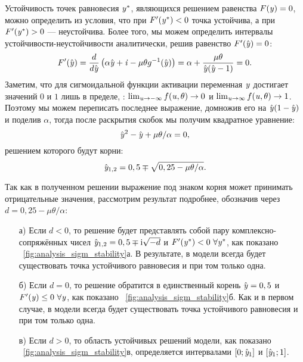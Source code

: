 Устойчивость точек равновесия $\mathit{y}^{*}$, являющихся решением равенства $F(\mathit{y}) = 0$, можно определить из условия, что при $F^{\prime}(\mathit{y}^{*}) < 0$ точка устойчива, а при $F^{\prime}(\mathit{y}^{*}) > 0$ --- неустойчива. Более того, мы можем определить интервалы устойчивости-неустойчивости аналитически, решив равенство $F^{\prime}(\hat{\mathit{y}}) = 0$:
\begin{equation}
    \nonumber
    F^{\prime}(\hat{\mathit{y}}) 
    = \dfrac{d}{d\hat{\mathit{y}}}\left( \alpha \hat{\mathit{y}} + \mathit{i} - \mu \theta g^{-1}(\hat{\mathit{y}}) \right) 
    = \alpha + \dfrac{\mu \theta}{\hat{\mathit{y}}(\hat{\mathit{y}} - 1)}
    = 0.
\end{equation}
Заметим, что для сигмоидальной функции активации переменная $\mathit{y}$ достигает значений $0$ и $1$ лишь в пределе, \ie: $\lim_{\mathit{u} \to -\infty} f(\mathit{u}, \theta) \to 0$ и $\lim_{\mathit{u} \to \infty} f(\mathit{u}, \theta) \to 1$. Поэтому мы можем переписать последнее выражение, домножив его на $\hat{\mathit{y}}(1 - \hat{\mathit{y}})$ и поделив $\alpha$, тогда после раскрытия скобок мы получим квадратное уравнение:
\begin{equation}
    \nonumber
    \hat{\mathit{y}}^{2} - \hat{\mathit{y}} + \mu \theta / \alpha = 0,
\end{equation}
решением которого будут корни:
\begin{equation}
    \label{eq:sigm_stability_solution}
    \hat{\mathit{y}}_{1,2} = 0,5 \mp \sqrt{0,25 - \mu \theta / \alpha}.
\end{equation}

Так как в полученном решении выражение под знаком корня может принимать отрицательные значения, рассмотрим результат подробнее, обозначив через $d = 0,25 - \mu \theta / \alpha$:
\begin{itemize}
    \item[а)] Если $d < 0$, то решение будет представлять собой пару комплексно-сопряжённых чисел $\hat{\mathit{y}}_{1,2} = 0,5 \mp \mathrm{i}\sqrt{-d}$ и $F^{\prime}(\scalar{y}^{*}) < 0\ \forall\scalar{y}^{*}$, как показано \onfigure~\ref{fig:analysis_sigm_stability}а. В результате, в модели всегда будет существовать точка устойчивого равновесия и при том только одна.
    \item[б)] Если $d = 0$, то решение обратится в единственный корень $\hat{\mathit{y}} = 0,5$ и $F^{\prime}(\scalar{y}) \le 0\ \forall\scalar{y}$, как показано \onfigure~\ref{fig:analysis_sigm_stability}б. Как и в первом случае, в модели всегда будет существовать точка устойчивого равновесия и при том только одна.
    \item[в)] Если $d > 0$, то область устойчивых решений модели, как показано \onfigure~\ref{fig:analysis_sigm_stability}в, определяется интервалами $\left[0; \hat{\mathit{y}}_{1}\right]$ и $\left[\hat{\mathit{y}}_{1}; 1\right]$.
\end{itemize}

